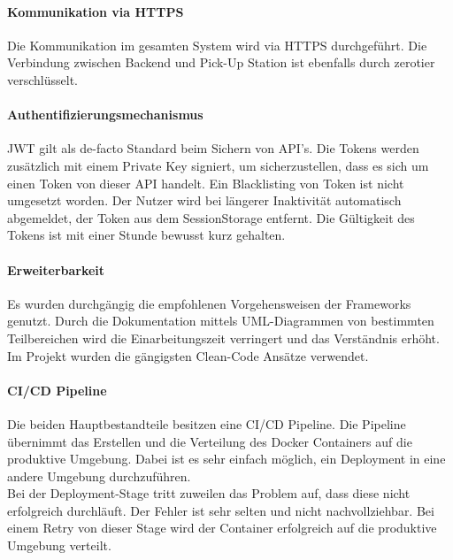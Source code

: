 \paragraph{Kommunikation via HTTPS}
Die Kommunikation im gesamten System wird via \ac{HTTPS} durchgeführt. Die Verbindung zwischen Backend und Pick-Up Station ist ebenfalls durch \gls{zerotier} verschlüsselt. 

\paragraph{Authentifizierungsmechanismus}
\ac{JWT} gilt als de-facto Standard beim Sichern von API's. Die Tokens werden zusätzlich mit einem Private Key signiert, um sicherzustellen, dass es sich um einen Token von dieser API handelt. Ein Blacklisting von Token ist nicht umgesetzt worden. Der Nutzer wird bei längerer Inaktivität automatisch abgemeldet, der Token aus dem \gls{SessionStorage} entfernt. Die Gültigkeit des Tokens ist mit einer Stunde bewusst kurz gehalten. 

\paragraph{Erweiterbarkeit}
Es wurden durchgängig die empfohlenen Vorgehensweisen der Frameworks genutzt. Durch die Dokumentation mittels \ac{UML}-Diagrammen von bestimmten Teilbereichen wird die Einarbeitungszeit verringert und das Verständnis erhöht. Im Projekt wurden die gängigsten Clean-Code Ansätze verwendet. 

\paragraph{CI/CD Pipeline}
Die beiden Hauptbestandteile besitzen eine CI/CD Pipeline. Die Pipeline übernimmt das Erstellen und die Verteilung des Docker Containers auf die produktive Umgebung. Dabei ist es sehr einfach möglich, ein Deployment in eine andere Umgebung durchzuführen. \\

Bei der Deployment-Stage tritt zuweilen das Problem auf, dass diese nicht erfolgreich durchläuft. Der Fehler ist sehr selten und nicht nachvollziehbar. Bei einem Retry von dieser Stage wird der Container erfolgreich auf die produktive Umgebung verteilt. 
\newpage
